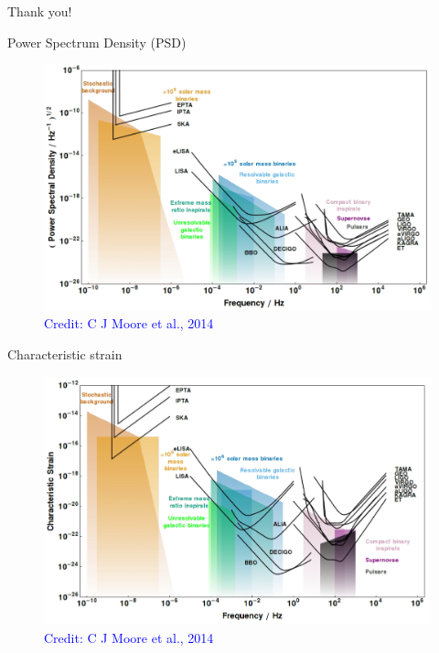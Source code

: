 \documentclass[pdf]{beamer}
\newcommand{\credit}[1]{\tiny{\textcolor{blue}{Credit: #1}}}
\begin{document}
\begin{frame}
\begin{center}
\Huge Thank you!
\end{center}
\end{frame}

\begin{frame}{Power Spectrum Density (PSD)}
\begin{figure}
\includegraphics[scale=.2]{fig/PSD-TOT.png}
\caption*{\credit{C J Moore et al., 2014}}
\end{figure}
\end{frame}

\begin{frame}{Characteristic strain}
\begin{figure}
\includegraphics[scale=.2]{fig/Char-TOT.png}
\caption*{\credit{C J Moore et al., 2014}}
\end{figure}
\end{frame}
\end{document}

